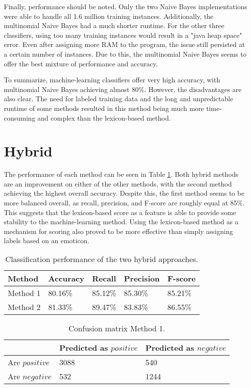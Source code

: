 Finally, performance should be noted. Only the two Naive Bayes implementations were able to handle all 1.6 million training instances. Additionally, the multinomial Naive Bayes had a much shorter runtime. For the other three classifiers, using too many training instances would result in a "java heap space" error. Even after assigning more RAM to the program, the issue still persisted at a certain number of instances. Due to this, the multinomial Naive Bayes seems to offer the best mixture of performance and accuracy.

To summarize, machine-learning classifiers offer very high accuracy, with multinomial Naive Bayes achieving almost 80\%. However, the disadvantages are also clear. The need for labeled training data and the long and unpredictable runtime of some methods resulted in this method being much more time-consuming and complex than the lexicon-based method.

\section{Hybrid}

The performance of each method can be seen in Table \ref{tab:evaluations_hybrid}. Both hybrid methods are an improvement on either of the other methods, with the second method achieving the highest overall accuracy. Despite this, the first method seems to be more balanced overall, as recall, precision, and F-score are roughly equal at 85\%. This suggests that the lexicon-based score as a feature is able to provide some stability to the machine-learning method. Using the lexicon-based method as a mechanism for scoring also proved to be more effective than simply assigning labels based on an emoticon. 

\begin{table}
\caption{Classification performance of the two hybrid approaches.}
\centering
\begin{tabular}{ |p{2cm}||p{2cm}|p{2cm}|p{2cm}|p{2cm}|}
 \hline
 Method &          Accuracy &      Recall &     Precision& F-score \\
 \hline
 Method 1       & 80.16\%&        85.12\%&       85.30\%& 85.21\%\\
  \hline
 Method 2       & 81.33\%&        89.47\%&       83.83\%& 86.55\%\\
  \hline
\end{tabular}
\label{tab:evaluations_hybrid}
\end{table}

\iffalse
\begin{table}[]
\centering
\caption{Confusion matrix Method 1.}
\begin{tabular}{ |p{3cm}||p{3cm}|p{3cm}| }
 \hline
  &          Predicted as $positive$ &Predicted as $negative$  \\
 \hline
 Are $positive$        & 3088&            540\\
  \hline
 Are $negative$  &532&                     1244\\
 \hline

\end{tabular}
\label{tab:method1_conf}
\end{table}

